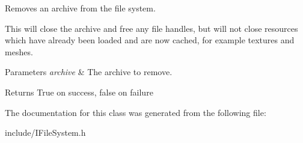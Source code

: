 Removes an archive from the file system. 

This will close the archive and free any file handles, but will not close resources which have already been loaded and are now cached, for example textures and meshes. 
\begin{DoxyParams}{Parameters}
{\em archive} & The archive to remove. \\
\hline
\end{DoxyParams}
\begin{DoxyReturn}{Returns}
True on success, false on failure 
\end{DoxyReturn}


The documentation for this class was generated from the following file\+:\begin{DoxyCompactItemize}
\item 
include/I\+File\+System.\+h\end{DoxyCompactItemize}
